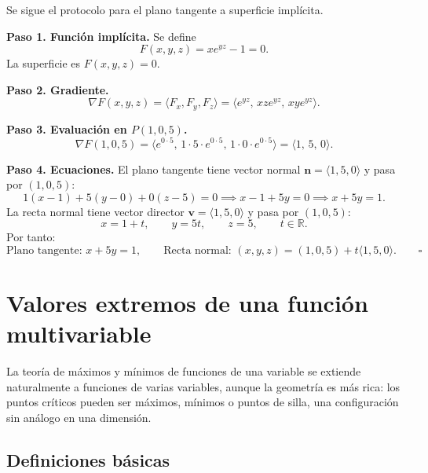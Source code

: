 \begin{myproof}
Se sigue el protocolo para el plano tangente a superficie implícita.

\textbf{Paso 1. Función implícita.} Se define
\[
F(x,y,z) = x e^{yz} - 1 = 0.
\]
La superficie es $F(x,y,z)=0$.

\textbf{Paso 2. Gradiente.}
\[
\nabla F(x,y,z)
= \langle F_x, F_y, F_z \rangle
= \langle e^{yz},\, xz e^{yz},\, xy e^{yz} \rangle.
\]

\textbf{Paso 3. Evaluación en $P(1,0,5)$.}
\[
\nabla F(1,0,5)
= \langle e^{0\cdot 5},\, 1\cdot 5\cdot e^{0\cdot 5},\,
  1\cdot 0\cdot e^{0\cdot 5} \rangle
= \langle 1,\, 5,\, 0 \rangle.
\]

\textbf{Paso 4. Ecuaciones.}
El plano tangente tiene vector normal $\mathbf{n} = \langle 1,5,0 \rangle$
y pasa por $(1,0,5)$:
\[
1(x-1) + 5(y-0) + 0(z-5) = 0
\implies x - 1 + 5y = 0
\implies x + 5y = 1.
\]
La recta normal tiene vector director $\mathbf{v} = \langle 1,5,0 \rangle$
y pasa por $(1,0,5)$:
\[
x = 1 + t,\qquad y = 5t,\qquad z = 5,\qquad t\in\mathbb{R}.
\]
Por tanto:
\[
\boxed{\text{Plano tangente: } x + 5y = 1,\qquad
\text{Recta normal: } (x,y,z) = (1,0,5) + t\langle 1,5,0 \rangle}.
\qquad\square
\]
\end{myproof}

\section{Valores extremos de una función multivariable}

La teoría de máximos y mínimos de funciones de una variable se extiende
naturalmente a funciones de varias variables, aunque la geometría es más
rica: los puntos críticos pueden ser máximos, mínimos o puntos de silla,
una configuración sin análogo en una dimensión.

\subsection{Definiciones básicas}

